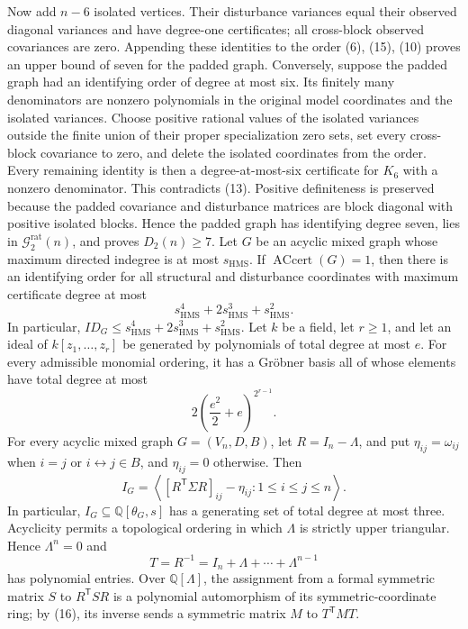 Now add \(n-6\) isolated vertices.  Their disturbance variances equal their observed diagonal variances and have degree-one certificates; all cross-block observed covariances are zero.  Appending these identities to the order (6), (15), (10) proves an upper bound of seven for the padded graph.  Conversely, suppose the padded graph had an identifying order of degree at most six.  Its finitely many denominators are nonzero polynomials in the original model coordinates and the isolated variances.  Choose positive rational values of the isolated variances outside the finite union of their proper specialization zero sets, set every cross-block covariance to zero, and delete the isolated coordinates from the order.  Every remaining identity is then a degree-at-most-six certificate for \(K_6\) with a nonzero denominator.  This contradicts (13).  Positive definiteness is preserved because the padded covariance and disturbance matrices are block diagonal with positive isolated blocks.  Hence the padded graph has identifying degree seven, lies in \(\mathcal G_{2}^{\mathrm{rat}}(n)\), and proves \(D_2(n)\geq7\).
Let \(G\) be an acyclic mixed graph whose maximum directed indegree is at most \(s_{\mathrm{HMS}}\).  If \(\operatorname{ACcert}(G)=1\), then there is an identifying order for all structural and disturbance coordinates with maximum certificate degree at most
\[
 s_{\mathrm{HMS}}^4+2s_{\mathrm{HMS}}^3+s_{\mathrm{HMS}}^2.
\]
In particular, \(ID_G\leq s_{\mathrm{HMS}}^4+2s_{\mathrm{HMS}}^3+s_{\mathrm{HMS}}^2\).
Let \(k\) be a field, let \(r\geq1\), and let an ideal of \(k[z_1,\ldots,z_r]\) be generated by polynomials of total degree at most \(e\).  For every admissible monomial ordering, it has a Gröbner basis all of whose elements have total degree at most
\[
 2\left(\frac{e^2}{2}+e\right)^{2^{r-1}}.
\]
For every acyclic mixed graph \(G=(V_n,D,B)\), let \(R=I_n-\Lambda\), and put \(\eta_{ij}=\omega_{ij}\) when \(i=j\) or \(i\leftrightarrow j\in B\), and \(\eta_{ij}=0\) otherwise.  Then
\[
 I_G=\left\langle [R^{\mathsf T}\Sigma R]_{ij}-\eta_{ij}:1\leq i\leq j\leq n\right\rangle .
\]
In particular, \(I_G\subseteq\mathbb Q[\theta_G,s]\) has a generating set of total degree at most three.
Acyclicity permits a topological ordering in which \(\Lambda\) is strictly upper triangular.  Hence \(\Lambda^n=0\) and
\[
 T=R^{-1}=I_n+\Lambda+\cdots+\Lambda^{n-1} \tag{16}
\]
has polynomial entries.  Over \(\mathbb Q[\Lambda]\), the assignment from a formal symmetric matrix \(S\) to \(R^{\mathsf T}SR\) is a polynomial automorphism of its symmetric-coordinate ring; by (16), its inverse sends a symmetric matrix \(M\) to \(T^{\mathsf T}MT\).

